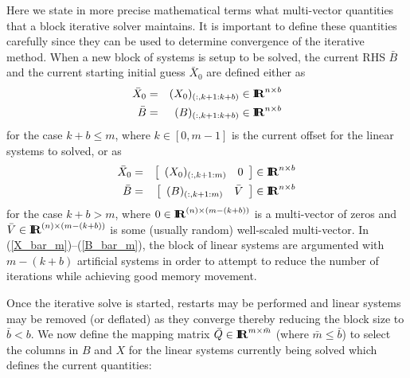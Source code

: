\documentclass[pdf,ps2pdf,11pt]{SANDreport}
\begin{document}
Here we state in more precise mathematical terms what multi-vector
quantities that a block iterative solver maintains.  It is important
to define these quantities carefully since they can be used to
determine convergence of the iterative method.  When a new block of
systems is setup to be solved, the current RHS $\bar{B}$ and the
current starting initial guess $\bar{X}_0$ are defined either as
%
\begin{eqnarray}
\bar{X}_0 & = & (X_0)_{(:,k+1:k+b)} \in \RE^{n \times b} \label{X_bar_r_b} \\
\bar{B}   & = & (B)_{(:,k+1:k+b)} \in \RE^{n \times b} \label{B_bar_r_b}
\end{eqnarray}
%
{}\noindent{}for the case $k+b {}\leq m$, where $k\in[0,m-1]$ is the
current offset for the linear systems to solved, or as
%
\begin{eqnarray}
\bar{X}_0 & = & {\bmat{cc} (X_0)_{(:,k+1:m)} & 0 \emat} \in \RE^{n \times b} \label{X_bar_m} \\
\bar{B}   & = & {\bmat{cc} (B)_{(:,k+1:m)} & \bar{V} \emat} \in \RE^{n \times b} \label{B_bar_m}
\end{eqnarray}
%
{}\noindent{}for the case $k+b > m$, where $0\in\RE^{(n) {}\times
(m-(k+b))}$ is a multi-vector of zeros and $\bar{V}\in\RE^{(n) {}\times
(m-(k+b))}$ is some (usually random) well-scaled multi-vector.  In
(\ref{X_bar_m})--(\ref{B_bar_m}), the block of linear systems are
argumented with $m-(k+b)$ artificial systems in order to attempt to
reduce the number of iterations while achieving good memory movement.

Once the iterative solve is started, restarts may be performed and
linear systems may be removed (or deflated) as they converge thereby
reducing the block size to $\bar{b} < b$.  We now define the mapping
matrix $\bar{Q}\in\RE^{m {}\times {}\bar{m}}$ (where $\bar{m} {}\leq
\bar{b}$) to select the columns in $B$ and $X$ for the linear systems
currently being solved which defines the current quantities:
\end{document}
